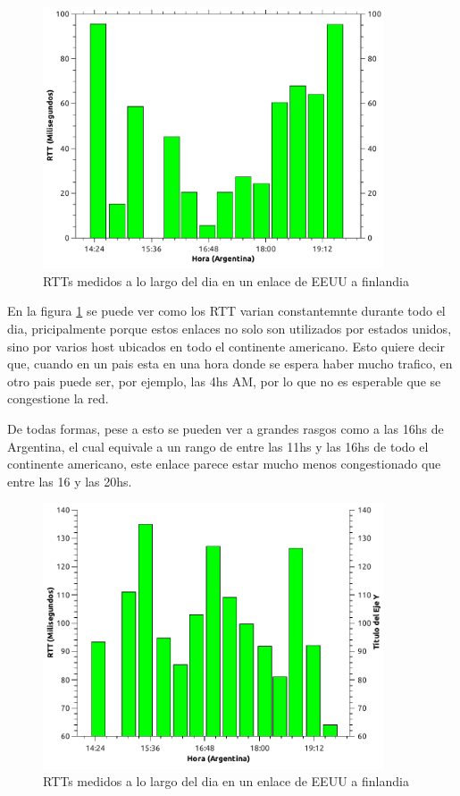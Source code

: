\begin{figure}[H]
  \centering
    \includegraphics[width=0.9\textwidth]{graficos/rtts_dia_finlandia.pdf}
    \caption{RTTs medidos a lo largo del dia en un enlace de EEUU a finlandia}
    \label{fig:rtts_fin}
\end{figure}


En la figura \ref{fig:rtts_fin} se puede ver como los RTT varian constantemnte durante todo el dia, pricipalmente porque estos enlaces no solo son utilizados por estados unidos, sino por varios host ubicados en todo el continente americano. Esto quiere decir que, cuando en un pais esta en una hora donde se espera haber mucho trafico, en otro pais puede ser, por ejemplo, las 4hs AM, por lo que no es esperable que se congestione la red. 

De todas formas, pese a esto se pueden ver a grandes rasgos como a las 16hs de Argentina, el cual equivale a un rango de entre las 11hs y las 16hs de todo el continente americano, este enlace parece estar mucho menos congestionado que entre las 16 y las 20hs. 



\begin{figure}[H]
  \centering
    \includegraphics[width=0.9\textwidth]{graficos/rtts_dia_inglaterra.pdf}
    \caption{RTTs medidos a lo largo del dia en un enlace de EEUU a finlandia}
    \label{fig:rtts_ing}
\end{figure}